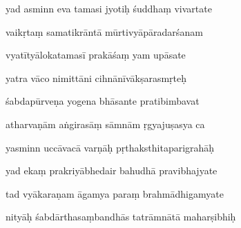 \documentclass[article,12pt,a4paper]{memoir}%
\newcounter{parCount}
\begin{document}
	  
	  \pstart \leavevmode%
	yad asminn eva tamasi jyotiḥ śuddhaṃ vivartate 
	{}
	\pend%
      

	  
	  \pstart {} vaikṛtaṃ samatikrāntā mūrtivyāpāradarśanam 
	{}
	\pend%
      

	  
	  \pstart \leavevmode%
	vyatītyālokatamasī prakāśaṃ yam upāsate 
	{}
	\pend%
      

	  
	  \pstart {} yatra vāco nimittāni cihnānīvākṣarasmṛteḥ 
	{}
	\pend%
      

	  
	  \pstart \leavevmode%
	śabdapūrveṇa yogena bhāsante pratibimbavat 
	{}
	\pend%
      

	  
	  \pstart {} atharvaṇām aṅgirasāṃ sāmnām ṛgyajuṣasya ca 
	{}
	\pend%
      

	  
	  \pstart \leavevmode%
	yasminn uccāvacā varṇāḥ pṛthaksthitaparigrahāḥ 
	{}
	\pend%
      

	  
	  \pstart {} yad ekaṃ prakriyābhedair bahudhā pravibhajyate 
	{}
	\pend%
      

	  
	  \pstart \leavevmode%
	tad vyākaraṇam āgamya paraṃ brahmādhigamyate 
	{}
	\pend%
      

	  
	  \pstart {} nityāḥ śabdārthasaṃbandhās tatrāmnātā maharṣibhiḥ 
	{}
	\pend%
      
\end{document}
